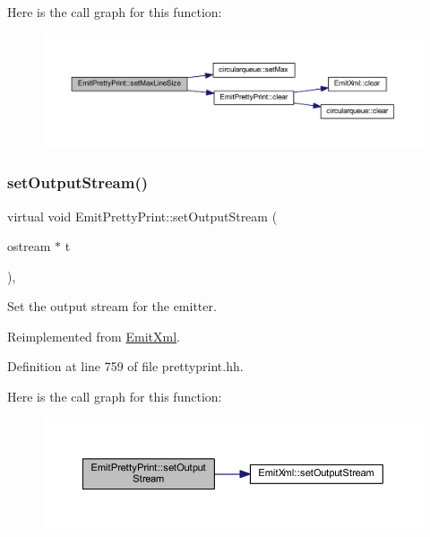 Here is the call graph for this function\+:
\nopagebreak
\begin{figure}[H]
\begin{center}
\leavevmode
\includegraphics[width=350pt]{class_emit_pretty_print_a998863b23c0a4a8e8f8c061453fffaf7_cgraph}
\end{center}
\end{figure}
\mbox{\label{class_emit_pretty_print_a049d0fd7579b85ec08321f08db93caad}} 
\subsubsection{\texorpdfstring{setOutputStream()}{setOutputStream()}}
{\footnotesize\ttfamily virtual void Emit\+Pretty\+Print\+::set\+Output\+Stream (\begin{DoxyParamCaption}\item[{ostream $\ast$}]{t }\end{DoxyParamCaption})\hspace{0.3cm}{\ttfamily [inline]}, {\ttfamily [virtual]}}



Set the output stream for the emitter. 



Reimplemented from \mbox{\hyperlink{class_emit_xml_a92a27602a190342a8f055fdcc178f5b9}{Emit\+Xml}}.



Definition at line 759 of file prettyprint.\+hh.

Here is the call graph for this function\+:
\nopagebreak
\begin{figure}[H]
\begin{center}
\leavevmode
\includegraphics[width=350pt]{class_emit_pretty_print_a049d0fd7579b85ec08321f08db93caad_cgraph}
\end{center}
\end{figure}
\mbox{\label{class_emit_pretty_print_a6807c90766479cc6c03c8b0c40a8708f}} 
